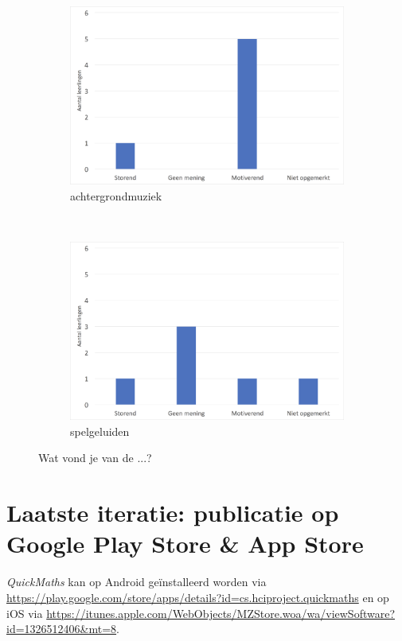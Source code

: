 \documentclass[11pt]{article}
\begin{document}
\begin{figure}
	\centering
    \begin{subfigure}[b]{0.48\textwidth}
        \includegraphics[width=\textwidth]{pictures/3_Achtergrondmuziek.png}
        \caption{achtergrondmuziek}
        \label{achtergrondmuziek}
    \end{subfigure}
    ~
    \begin{subfigure}[b]{0.48\textwidth}
        \includegraphics[width=\textwidth]{pictures/3_Spelgeluiden.png}
        \caption{spelgeluiden}
        \label{spelgeluiden}
    \end{subfigure}
    \caption{Wat vond je van de ...?}\label{geluiden}
\end{figure}

\clearpage
\section{Laatste iteratie: publicatie op Google Play Store \& App Store}
\textit{QuickMaths} kan op Android ge\"installeerd worden via \url{https://play.google.com/store/apps/details?id=cs.hciproject.quickmaths} en op iOS via \url{https://itunes.apple.com/WebObjects/MZStore.woa/wa/viewSoftware?id=1326512406&mt=8}.
\end{document}
